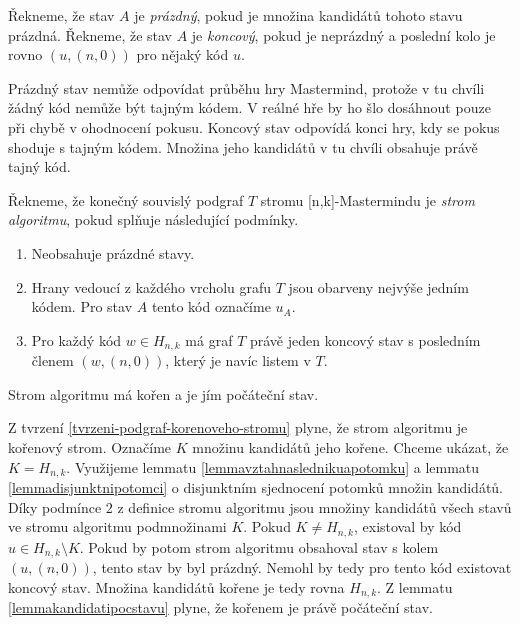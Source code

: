 \begin{definice}\label{kandidat}
  Řekneme, že stav $A$ je \emph{prázdný}, pokud je množina kandidátů tohoto stavu prázdná. Řekneme, že stav $A$ je \emph{koncový}, pokud je neprázdný a poslední kolo je rovno $(u,(n,0))$ pro nějaký kód $u$.
\end{definice}

Prázdný stav nemůže odpovídat průběhu hry Mastermind, protože v tu chvíli žádný kód nemůže být tajným kódem. V reálné hře by ho šlo dosáhnout pouze při chybě v ohodnocení pokusu. Koncový stav odpovídá konci hry, kdy se pokus shoduje s tajným kódem. Množina jeho kandidátů v tu chvíli obsahuje právě tajný kód. 


\begin{definice}
  Řekneme, že konečný souvislý podgraf $T$ stromu [n,k]-Mastermindu je \emph{strom algoritmu}, pokud splňuje následující podmínky.
  \begin{enumerate}
      \item Neobsahuje prázdné stavy.
      \item Hrany vedoucí z každého vrcholu grafu $T$ jsou obarveny nejvýše jedním kódem. Pro stav $A$ tento kód označíme $u_A$.
      \item Pro každý kód $w \in H_{n,k}$ má graf $T$ právě jeden koncový stav s posledním členem $(w, (n,0))$, který je navíc listem v $T$.
  \end{enumerate}
\end{definice}

\begin{tvrz}\label{tvrzkorenstromualg}
    Strom algoritmu má kořen a je jím počáteční stav. 
\end{tvrz}
\begin{dukaz}
    Z tvrzení \ref{tvrzeni-podgraf-korenoveho-stromu} plyne, že strom algoritmu je kořenový strom. Označíme $K$ množinu kandidátů jeho kořene. Chceme ukázat, že $K = H_{n,k}$.
    Využijeme lemmatu \ref{lemmavztahnaslednikuapotomku} a lemmatu \ref{lemmadisjunktnipotomci} o disjunktním sjednocení potomků množin kandidátů. Díky podmínce $2$ z definice stromu algoritmu jsou množiny kandidátů všech stavů ve stromu algoritmu podmnožinami $K$. Pokud $K \neq H_{n,k}$, existoval by kód $u \in H_{n,k} \setminus K$. Pokud by potom strom algoritmu obsahoval stav s kolem $(u, (n,0))$, tento stav by byl prázdný. Nemohl by tedy pro tento kód existovat koncový stav. Množina kandidátů kořene je tedy rovna $H_{n,k}$. Z lemmatu \ref{lemmakandidatipocstavu} plyne, že kořenem je právě počáteční stav. 
\end{dukaz}

